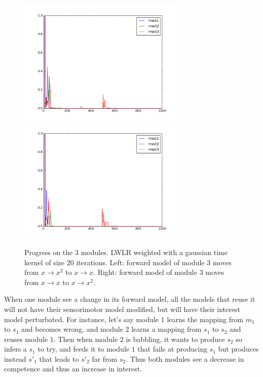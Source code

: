 \documentclass[12pt]{article}
\begin{document}
		\begin{figure}[H]
			\centering
			\includegraphics[width=8cm]{./include/NSLWLR_gt20_hard-easy.png}
			\includegraphics[width=8cm]{./include/NSLWLR_gt20_easy-hard.png}
			\caption{Progress on the 3 modules. LWLR weighted with a gaussian time kernel of size $20$ iterations. Left: forward model of module $3$ moves from $x\rightarrow x^2$ to $x\rightarrow x$.
			Right: forward model of module $3$ moves from $x\rightarrow x$ to $x\rightarrow x^2$.}
			\label{gt20}
		\end{figure}
		
		
		When one module see a change in its forward model, all the models that reuse it will not have their sensorimotor model modified, but will have their interest model perturbated.
		For instance, let's say module $1$ learns the mapping from $m_1$ to $s_1$ and becomes wrong, and module $2$ learns a mapping from $s_1$ to $s_2$ and reuses module $1$.
		Then when module $2$ is babbling, it wants to produce $s_2$ so infers a $s_1$ to try, and feeds it to module $1$ that fails at producing $s_1$ but produces instead $s'_1$ that leads to $s'_2$ far from $s_2$. 
		Thus both modules see a decrease in competence and thus an increase in interest.
		
\end{document}
